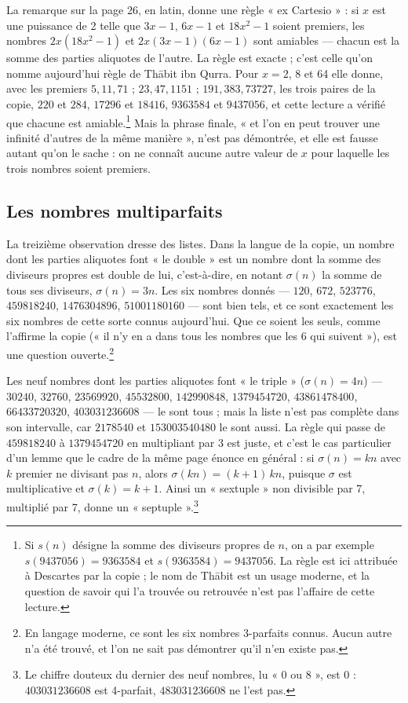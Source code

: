 \documentclass[11pt,a4paper]{article}
\begin{document}
La remarque sur la page 26, en latin, donne une règle « ex Cartesio » : si
$x$ est une puissance de 2 telle que $3x - 1$, $6x - 1$ et $18x^2 - 1$ soient
premiers, les nombres $2x(18x^2 - 1)$ et $2x(3x-1)(6x-1)$ sont amiables — chacun
est la somme des parties aliquotes de l'autre. La règle est exacte ; c'est
celle qu'on nomme aujourd'hui règle de Thābit ibn Qurra. Pour $x = 2$, 8 et 64
elle donne, avec les premiers $5, 11, 71$ ; $23, 47, 1151$ ; $191, 383, 73727$,
les trois paires de la copie, $220$ et $284$, $17296$ et $18416$, $9363584$ et
$9437056$, et cette lecture a vérifié que chacune est amiable.\footnote{Si
$s(n)$ désigne la somme des diviseurs propres de $n$, on a par exemple
$s(9437056) = 9363584$ et $s(9363584) = 9437056$. La règle est ici attribuée à
Descartes par la copie ; le nom de Thābit est un usage moderne, et la question de
savoir qui l'a trouvée ou retrouvée n'est pas l'affaire de cette lecture.} Mais la
phrase finale, « et l'on en peut trouver une infinité d'autres de la même
manière », n'est pas démontrée, et elle est fausse autant qu'on le sache : on ne
connaît aucune autre valeur de $x$ pour laquelle les trois nombres soient
premiers.

\subsection*{Les nombres multiparfaits}

La treizième observation dresse des listes. Dans la langue de la copie, un nombre
dont les parties aliquotes font « le double » est un nombre dont la somme des
diviseurs propres est double de lui, c'est-à-dire, en notant $\sigma(n)$ la
somme de tous ses diviseurs, $\sigma(n) = 3n$. Les six nombres donnés —
$120$, $672$, $523776$, $459818240$, $1476304896$, $51001180160$ — sont bien tels, et ce
sont exactement les six nombres de cette sorte connus aujourd'hui. Que ce soient
les seuls, comme l'affirme la copie (« il n'y en a dans tous les nombres que les
6 qui suivent »), est une question ouverte.\footnote{En langage moderne, ce sont
les six nombres 3-parfaits connus. Aucun autre n'a été trouvé, et l'on ne sait
pas démontrer qu'il n'en existe pas.}

Les neuf nombres dont les parties aliquotes font « le triple » ($\sigma(n) =
4n$) — $30240$, $32760$, $23569920$, $45532800$, $142990848$, $1379454720$, $43861478400$, $66433720320$, $403031236608$ — le sont tous ; mais la liste n'est pas complète
dans son intervalle, car $2178540$ et $153003540480$ le sont aussi. La règle
qui passe de $459818240$ à $1379454720$ en multipliant par 3 est juste, et c'est
le cas particulier d'un lemme que le cadre de la même page énonce en général :
si $\sigma(n) = kn$ avec $k$ premier ne divisant pas $n$, alors
$\sigma(kn) = (k+1)\,kn$, puisque $\sigma$ est multiplicative et
$\sigma(k) = k + 1$. Ainsi un « sextuple » non divisible par 7, multiplié par 7,
donne un « septuple ».\footnote{Le chiffre douteux du dernier des neuf nombres,
lu « 0 ou 8 », est 0 : $403031236608$ est 4-parfait, $483031236608$ ne l'est
pas.}
\end{document}
